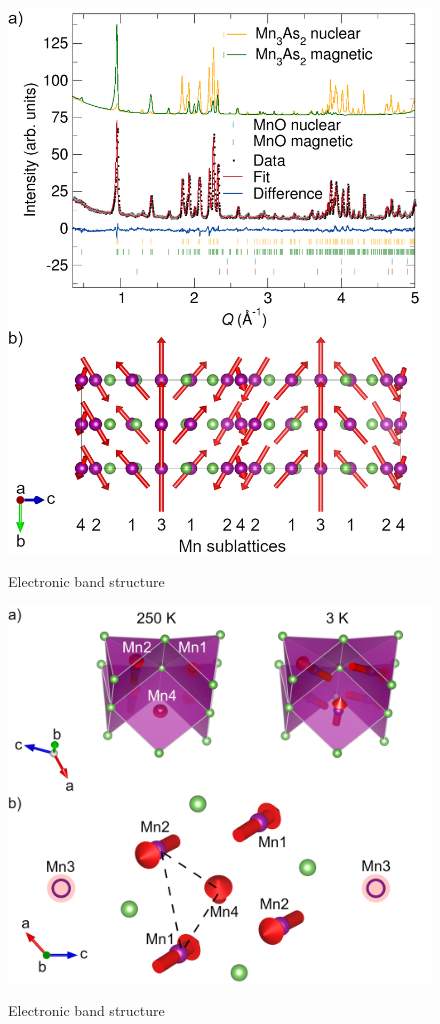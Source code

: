 \documentclass[11pt,edeposit,draftthesis]{uiucthesis2020}
\begin{document}
\begin{mainmatter}
\begin{figure}
\centering\includegraphics[width=\columnwidth]{figures/ch6/3K_mag_structure.png} \\
\caption{\label{fig:3K}
Electronic band structure
}
\end{figure}


\begin{figure}
\centering\includegraphics[width=\columnwidth]{figures/ch6/spin_canting_dps.png} \\
\caption{\label{fig:spin_canting}
Electronic band structure
}
\end{figure}


\end{mainmatter}
\end{document}
